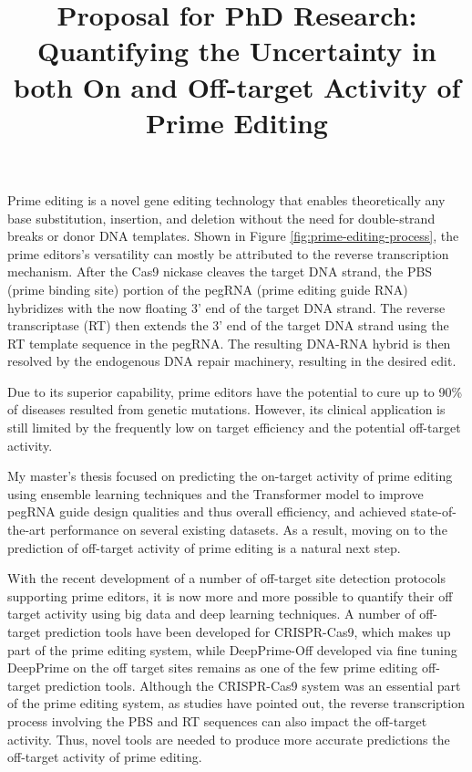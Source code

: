 \documentclass[a4,12pt]{article}
\title{Proposal for PhD Research: 
Quantifying the Uncertainty in both On and Off-target Activity of Prime Editing}
\author{}
\date{}
\begin{document}
\maketitle

Prime editing is a novel gene editing technology that enables theoretically any base substitution, insertion, and deletion without the need for double-strand breaks or donor DNA templates\cite{liudavidr.SearchreplaceGenomeEditing2019,liuPrimeEditingPrecise2023}. Shown in Figure \ref{fig:prime-editing-process}, the prime editors's versatility can mostly be attributed to the reverse transcription mechanism. After the Cas9 nickase cleaves the target DNA strand, the PBS (prime binding site) portion of the pegRNA (prime editing guide RNA) hybridizes with the now floating 3' end of the target DNA strand. The reverse transcriptase (RT) then extends the 3' end of the target DNA strand using the RT template sequence in the pegRNA. The resulting DNA-RNA hybrid is then resolved by the endogenous DNA repair machinery, resulting in the desired edit.

Due to its superior capability, prime editors have the potential to cure up to 90\% of diseases resulted from genetic mutations. However, its clinical application is still limited by the frequently low on target efficiency and the potential off-target activity\cite{zhaoPrimeEditingAdvances2023}.

My master's thesis focused on predicting the on-target activity of prime editing using ensemble learning techniques and the Transformer model to improve pegRNA guide design qualities and thus overall efficiency, and achieved state-of-the-art performance on several existing datasets. As a result, moving on to the prediction of off-target activity of prime editing is a natural next step.

With the recent development of a number of off-target site detection protocols supporting prime editors, it is now more and more possible to quantify their off target activity using big data and deep learning techniques\parencite{liangGenomewideProfilingPrime2023,
zhuTrackingseqRevealsHeterogeneity2024}.
A number of off-target prediction tools have been developed for CRISPR-Cas9, which makes up part of the prime editing system, while DeepPrime-Off developed via fine tuning DeepPrime on the off target sites remains as one of the few prime editing off-target prediction tools. Although the CRISPR-Cas9 system was an essential part of the prime editing system, as studies have pointed out, the reverse transcription process involving the PBS and RT sequences can also impact the off-target activity. Thus, novel tools are needed to produce more accurate predictions the off-target activity of prime editing\parencite{liangGenomewideProfilingPrime2023,yuPredictionEfficienciesDiverse2023}.
\end{document}
